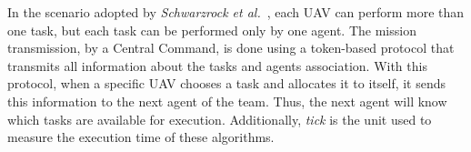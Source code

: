 In the scenario adopted by \textit{Schwarzrock et al.}~\cite{MAS07}, each UAV can perform more than one task, but each task can be performed only by one agent. The mission transmission, by a Central Command, is done using a token-based protocol that transmits all information about the tasks and agents association. With this protocol, when a specific UAV chooses a task and allocates it to itself, it sends this information to the next agent of the team. Thus, the next agent will know which tasks are available for execution. Additionally, \textit{tick} is the unit used to measure the execution time of these algorithms.